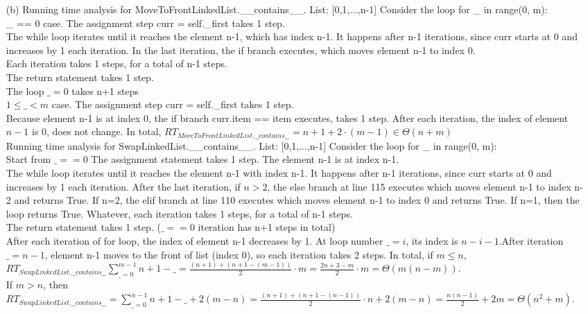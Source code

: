 \documentclass[fontsize=11pt]{article}
\begin{document}
\begin{enumerate}
\begin{enumerate}
    \item[(b)]
    Running time analysis for MoveToFrontLinkedList.\_\_contains\_\_.
    List: [0,1,...,n-1]
    Consider the loop for \_ in range(0, m):
    \\\_ == 0 case. The assignment step curr = self.\_first takes 1 step.
    \\The while loop iterates until it reaches the element n-1, which has index n-1. It happens after n-1 iterations, since curr starts at 0 and increases by 1 each iteration. In the last iteration, the if branch executes, which moves element n-1 to index 0.
    \\Each iteration takes 1 steps, for a total of n-1 steps.
    \\The return statement takes 1 step.
    \\The loop $\_=0$ takes n+1 steps
    \\$1\leq \_ <m$ case. The assignment step curr = self.\_first takes 1 step.
    \\Because element n-1 is at index 0, the if branch curr.item == item executes, takes 1 step. After each iteration, the index of element $n-1$ is 0, does not change.
    In total, $RT_{MoveToFrontLinkedList.\_\_contains\_\_}=n+1+2\cdot(m-1)\in \Theta(n+m)$
    \\Running time analysis for SwapLinkedList.\_\_contains\_\_.
    List: [0,1,...,n-1]
    Consider the loop for \_ in range(0, m):
    \\Start from $\_==0$ The assignment statement takes 1 step. The element n-1 is at index n-1.
    \\The while loop iterates until it reaches the element n-1 with index n-1. It happens after n-1 iterations, since curr starts at 0 and increases by 1 each iteration. After the last iteration, if $n > 2$, the else branch at line 115 executes which moves element n-1 to index n-2 and returns True. If n=2, the elif branch at line 110 executes which moves element n-1 to index 0 and returns True. If n=1, then the loop returns True. Whatever, each iteration takes 1 steps, for a total of n-1 steps.
    \\The return statement takes 1 step. ($\_==0$ iteration has n+1 steps in total)
    \\After each iteration of for loop, the index of element n-1 decreases by 1. At loop number $\_=i$, its index is $n-i-1$.After iteration $\_=n-1$, element n-1 moves to the front of list (index 0), so each iteration takes 2 steps. In total, if $m\leq n$, $RT_{SwapLinkedList.\_\_contains\_\_}\sum_{\_=0}^{m-1} n+1-\_=\frac{(n+1)+(n+1-(m-1))}{2}\cdot m=\frac{2n+3-m}{2}\cdot m =\Theta(m(n-m))$.
    \\If $m>n$, then $RT_{SwapLinkedList.\_\_contains\_\_}=\sum_{\_=0}^{n-1} n+1-\_+2(m-n)=\frac{(n+1)+(n+1-(n-1))}{2}\cdot n+ 2(m-n)=\frac{n(n-1)}{2}+2m =\Theta(n^2+m)$.


\end{enumerate}
\end{enumerate}
\end{document}
